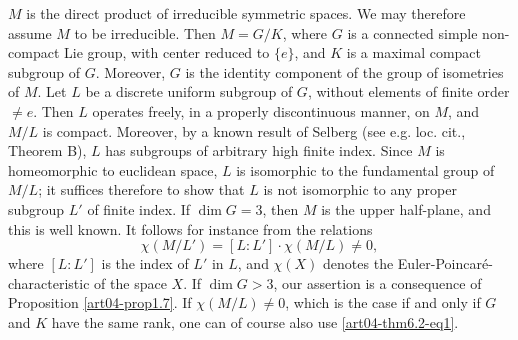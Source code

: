 $M$ is the direct product of irreducible symmetric spaces. We may therefore assume $M$ to be irreducible. Then $M=G/K$, where $G$ is a connected simple non-compact Lie group, with center reduced to $\{e\}$, and $K$ is a maximal compact subgroup of $G$. Moreover, $G$ is the identity component of the group of isometries of $M$. Let $L$ be a discrete uniform subgroup of $G$, without elements of finite order $\neq e$. Then $L$ operates freely, in a properly discontinuous manner, on $M$, and $M/L$ is compact. Moreover, by a known result of Selberg (see e.g. loc. cit., Theorem B), $L$ has subgroups of arbitrary high finite index. Since $M$ is homeomorphic to euclidean space, $L$ is isomorphic to the fundamental group of $M/L$; it suffices therefore to show that $L$ is not isomorphic to any proper subgroup $L'$ of finite index. If $\dim G=3$, then $M$ is the upper half-plane, and this is well known. It follows for instance from the relations
\setcounter{equation}{0}
\begin{equation}
\chi(M/L')=[L:L']\cdot \chi (M/L)\neq 0,\label{art04-thm6.2-eq1}
\end{equation}
where $[L:L']$ is the index of $L'$ in $L$, and $\chi(X)$ denotes the Euler-Poincar\'e-characteristic of the space $X$. If $\dim G>3$, our assertion is a consequence of Proposition \ref{art04-prop1.7}. If $\chi(M/L)\neq 0$, which is the case if and only if $G$ and $K$ have the same rank, one can of course also use \eqref{art04-thm6.2-eq1}.

